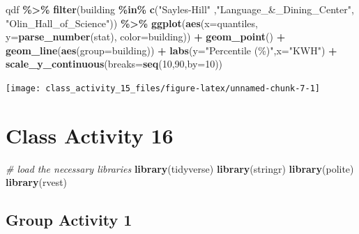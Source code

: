 \documentclass[
]{book}
\newenvironment{Shaded}{\begin{snugshade}}{\end{snugshade}}
\newcommand{\AttributeTok}[1]{\textcolor[rgb]{0.13,0.29,0.53}{#1}}
\newcommand{\CommentTok}[1]{\textcolor[rgb]{0.56,0.35,0.01}{\textit{#1}}}
\newcommand{\DecValTok}[1]{\textcolor[rgb]{0.00,0.00,0.81}{#1}}
\newcommand{\FunctionTok}[1]{\textcolor[rgb]{0.13,0.29,0.53}{\textbf{#1}}}
\newcommand{\NormalTok}[1]{#1}
\newcommand{\SpecialCharTok}[1]{\textcolor[rgb]{0.81,0.36,0.00}{\textbf{#1}}}
\newcommand{\StringTok}[1]{\textcolor[rgb]{0.31,0.60,0.02}{#1}}
\begin{document}
\begin{Shaded}
\begin{Highlighting}[]
\NormalTok{qdf }\SpecialCharTok{\%\textgreater{}\%} 
  \FunctionTok{filter}\NormalTok{(building }\SpecialCharTok{\%in\%} \FunctionTok{c}\NormalTok{(}\StringTok{"Sayles{-}Hill"}\NormalTok{ ,}\StringTok{"Language\_\&\_Dining\_Center"}\NormalTok{, }\StringTok{"Olin\_Hall\_of\_Science"}\NormalTok{))  }\SpecialCharTok{\%\textgreater{}\%}  
  \FunctionTok{ggplot}\NormalTok{(}\FunctionTok{aes}\NormalTok{(}\AttributeTok{x=}\NormalTok{quantiles, }\AttributeTok{y=}\FunctionTok{parse\_number}\NormalTok{(stat), }\AttributeTok{color=}\NormalTok{building)) }\SpecialCharTok{+}
  \FunctionTok{geom\_point}\NormalTok{() }\SpecialCharTok{+} 
  \FunctionTok{geom\_line}\NormalTok{(}\FunctionTok{aes}\NormalTok{(}\AttributeTok{group=}\NormalTok{building)) }\SpecialCharTok{+} 
  \FunctionTok{labs}\NormalTok{(}\AttributeTok{y=}\StringTok{"Percentile (\%)"}\NormalTok{,}\AttributeTok{x=}\StringTok{"KWH"}\NormalTok{) }\SpecialCharTok{+}
  \FunctionTok{scale\_y\_continuous}\NormalTok{(}\AttributeTok{breaks=}\FunctionTok{seq}\NormalTok{(}\DecValTok{10}\NormalTok{,}\DecValTok{90}\NormalTok{,}\AttributeTok{by=}\DecValTok{10}\NormalTok{))}
\end{Highlighting}
\end{Shaded}

\texttt{[image: class\_activity\_15\_files/figure-latex/unnamed-chunk-7-1]}

\hypertarget{class-activity-16}{%
\chapter{Class Activity 16}\label{class-activity-16}}

\begin{Shaded}
\begin{Highlighting}[]
\CommentTok{\# load the necessary libraries}
\FunctionTok{library}\NormalTok{(tidyverse)}
\FunctionTok{library}\NormalTok{(stringr)}
\FunctionTok{library}\NormalTok{(polite)}
\FunctionTok{library}\NormalTok{(rvest)}
\end{Highlighting}
\end{Shaded}

\hypertarget{group-activity-1-3}{%
\section{Group Activity 1}\label{group-activity-1-3}}
\end{document}
